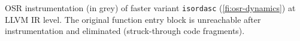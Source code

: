 \label{fig:isordascto} OSR instrumentation (in grey) of faster variant {\tt isordasc} (\myfigure\ref{fi:osr-dynamics}) at LLVM IR level. The original function entry block is unreachable after instrumentation and eliminated (struck-through code fragments).
